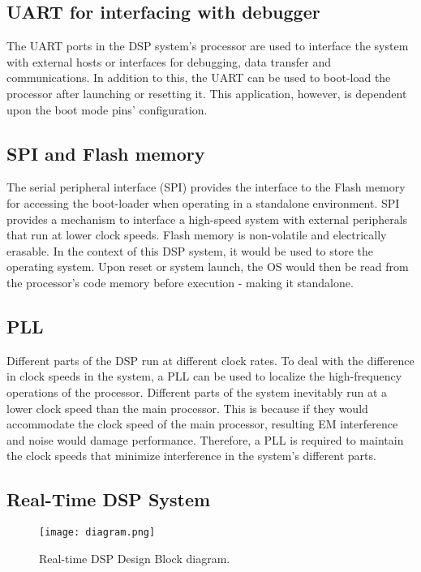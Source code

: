 \subsection{UART for interfacing with debugger}

The UART ports in the DSP system’s processor are used to interface the system with external hosts or interfaces for debugging, data transfer and communications. In addition to this, the UART can be used to boot-load the processor after launching or resetting it. This application, however, is dependent upon the boot mode pins’ configuration. 

\subsection{SPI and Flash memory}

The serial peripheral interface (SPI) provides the interface to the Flash memory for accessing the boot-loader when operating in a standalone environment. SPI provides a mechanism to interface a high-speed system with external peripherals that run at lower clock speeds. Flash memory is non-volatile and electrically erasable. In the context of this DSP system, it would be used to store the operating system. Upon reset or system launch, the OS would then be read from the processor’s code memory before execution - making it standalone. 


\subsection{PLL}
Different parts of the DSP run at different clock rates. To deal with the difference in clock speeds in the system, a PLL can be used to localize the high-frequency operations of the processor. Different parts of the system inevitably run at a lower clock speed than the main processor. This is because if they would accommodate the clock speed of the main processor, resulting EM interference and noise would damage performance. Therefore, a PLL is required to maintain the clock speeds that minimize interference in the system’s different parts. 


\subsection{Real-Time DSP System}

\begin{figure}[h!]
	\centering
	\texttt{[image: diagram.png]}
	\caption{Real-time DSP Design Block diagram.}
	\label{fig:block}
\end{figure}



